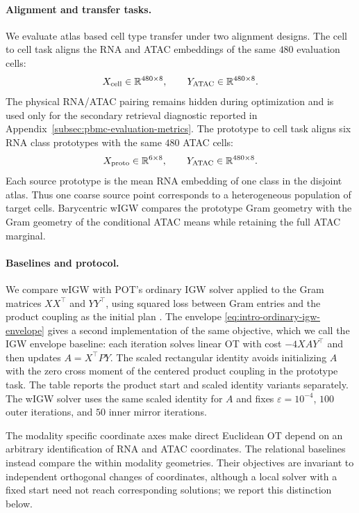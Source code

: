 \documentclass[11pt]{article}
\newcommand{\R}{\mathbb R}
\theoremstyle{plain}
\theoremstyle{definition}
\theoremstyle{remark}
\begin{document}
\paragraph{Alignment and transfer tasks.}
We evaluate atlas based cell type transfer under two alignment designs. The
cell to cell task aligns the RNA and ATAC
embeddings of the same \(480\)
evaluation cells:
\[
 X_{\rm cell}\in\R^{480\times8},
 \qquad Y_{\rm ATAC}\in\R^{480\times8}.
\]
The physical RNA/ATAC pairing remains hidden during optimization and is used
only for the secondary retrieval diagnostic reported in
Appendix~\ref{subsec:pbmc-evaluation-metrics}. The prototype to cell task aligns six
RNA class prototypes with the same \(480\) ATAC cells:
\[
 X_{\rm proto}\in\R^{6\times8},
 \qquad Y_{\rm ATAC}\in\R^{480\times8}.
\]
Each source prototype is the mean RNA embedding of one class in the disjoint
atlas. Thus one coarse source point corresponds to a heterogeneous population
of target cells. Barycentric wIGW compares the prototype Gram geometry with the
Gram geometry of the conditional ATAC means while retaining the full ATAC
marginal.

\paragraph{Baselines and protocol.}
We compare wIGW with POT's ordinary IGW solver applied to the Gram matrices
\(XX^\top\) and \(YY^\top\), using squared loss between Gram entries and the
product coupling as the initial plan \cite{POT}. The envelope
\eqref{eq:intro-ordinary-igw-envelope} gives a second implementation of the
same objective, which we call the IGW envelope baseline: each iteration solves
linear OT with cost \(-4XAY^\top\) and then updates \(A=X^\top P Y\). The scaled
rectangular identity avoids initializing \(A\) with the zero cross moment of the
centered product coupling in the prototype task. The table reports the product start
and scaled identity variants separately. The wIGW solver uses the same scaled
identity for \(A\) and fixes
\(\varepsilon=10^{-4}\), \(100\) outer iterations, and \(50\) inner mirror
iterations.

The modality specific coordinate axes make direct Euclidean OT depend on an
arbitrary identification of RNA and ATAC coordinates. The relational baselines
instead compare the within modality geometries. Their objectives are invariant to
independent orthogonal changes of coordinates, although a local solver with a fixed start
need not reach corresponding solutions; we report this distinction below.
\end{document}
